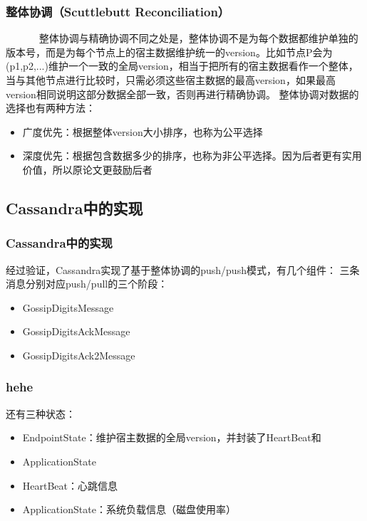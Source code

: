 \documentclass[slidestop,compress,mathserif,c]{beamer}
\begin{document}
\begin{frame}
\frametitle{整体协调（Scuttlebutt Reconciliation）}
~~~~~~ 整体协调与精确协调不同之处是，整体协调不是为每个数据都维护单独的版本号，而是为每个节点上的宿主数据维护统一的version。比如节点P会为(p1,p2,...)维护一个一致的全局version，相当于把所有的宿主数据看作一个整体，当与其他节点进行比较时，只需必须这些宿主数据的最高version，如果最高version相同说明这部分数据全部一致，否则再进行精确协调。
整体协调对数据的选择也有两种方法：
\begin{itemize}
\item 广度优先：根据整体version大小排序，也称为公平选择
\item 深度优先：根据包含数据多少的排序，也称为非公平选择。因为后者更有实用价值，所以原论文更鼓励后者
\end{itemize}
\end{frame}

\subsection{\hfill Cassandra中的实现}
\begin{frame}
\frametitle{Cassandra中的实现}
 经过验证，Cassandra实现了基于整体协调的push/push模式，有几个组件：
三条消息分别对应push/pull的三个阶段：
\begin{itemize}
\item GossipDigitsMessage
\item GossipDigitsAckMessage
\item GossipDigitsAck2Message
\end{itemize}
\end{frame}

\begin{frame}
\frametitle{hehe}
 还有三种状态：
 \begin{itemize}
\item EndpointState：维护宿主数据的全局version，并封装了HeartBeat和\item ApplicationState
\item HeartBeat：心跳信息
\item ApplicationState：系统负载信息（磁盘使用率）
 \end{itemize}
\end{frame}
\end{document}
